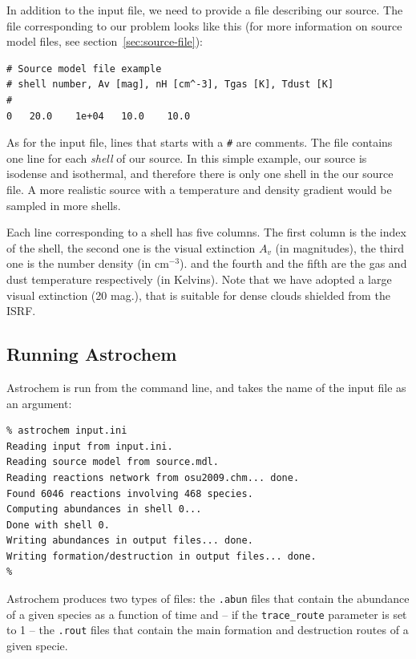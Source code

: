 \documentclass[a4paper,12pt]{article}
\begin{document}
In addition to the input file, we need to provide a file describing
our source. The file corresponding to our problem looks like this (for
more information on source model files, see
section~\ref{sec:source-file}):

\begin{verbatim}
# Source model file example
# shell number, Av [mag], nH [cm^-3], Tgas [K], Tdust [K]
#
0	20.0	1e+04	10.0	10.0
\end{verbatim}

As for the input file, lines that starts with a \verb=#= are
comments. The file contains one line for each \emph{shell} of our
source. In this simple example, our source is isodense and isothermal,
and therefore there is only one shell in the our source file. A more
realistic source with a temperature and density gradient would be
sampled in more shells.

Each line corresponding to a shell has five columns. The first column
is the index of the shell, the second one is the visual extinction
$A_{v}$ (in magnitudes), the third one is the number density (in
cm$^{-3}$). and the fourth and the fifth are the gas and dust
temperature respectively (in Kelvins).  Note that we have adopted a
large visual extinction (20 mag.), that is suitable for dense clouds
shielded from the ISRF.

\subsection{Running Astrochem}
\label{sec:running-astrochem}

Astrochem is run from the command line, and takes the name of the
input file as an argument:

\begin{verbatim}
% astrochem input.ini
Reading input from input.ini.
Reading source model from source.mdl.
Reading reactions network from osu2009.chm... done.
Found 6046 reactions involving 468 species.
Computing abundances in shell 0...
Done with shell 0.
Writing abundances in output files... done.
Writing formation/destruction in output files... done.
%
\end{verbatim}

Astrochem produces two types of files: the \verb=.abun= files that
contain the abundance of a given species as a function of time and --
if the \verb=trace_route= parameter is set to 1 -- the \verb=.rout=
files that contain the main formation and destruction routes of a
given specie.
\end{document}
